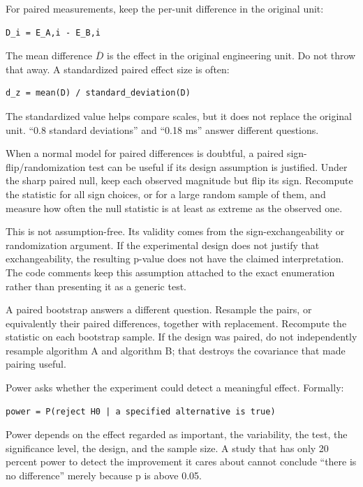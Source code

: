 For paired measurements, keep the per-unit difference in the original unit:

\begin{verbatim}
D_i = E_A,i - E_B,i
\end{verbatim}

The mean difference \(\overline{D}\) is the effect in the original engineering unit. Do not throw that away. A standardized paired effect size is often:

\begin{verbatim}
d_z = mean(D) / standard_deviation(D)
\end{verbatim}

The standardized value helps compare scales, but it does not replace the original unit. ``0.8 standard deviations'' and ``0.18 ms'' answer different questions.

When a normal model for paired differences is doubtful, a paired sign-flip/randomization test can be useful if its design assumption is justified. Under the sharp paired null, keep each observed magnitude but flip its sign. Recompute the statistic for all sign choices, or for a large random sample of them, and measure how often the null statistic is at least as extreme as the observed one.

This is not assumption-free. Its validity comes from the sign-exchangeability or randomization argument. If the experimental design does not justify that exchangeability, the resulting p-value does not have the claimed interpretation. The code comments keep this assumption attached to the exact enumeration rather than presenting it as a generic test.

A paired bootstrap answers a different question. Resample the pairs, or equivalently their paired differences, together with replacement. Recompute the statistic on each bootstrap sample. If the design was paired, do not independently resample algorithm A and algorithm B; that destroys the covariance that made pairing useful.

Power asks whether the experiment could detect a meaningful effect. Formally:

\begin{verbatim}
power = P(reject H0 | a specified alternative is true)
\end{verbatim}

Power depends on the effect regarded as important, the variability, the test, the significance level, the design, and the sample size. A study that has only 20 percent power to detect the improvement it cares about cannot conclude ``there is no difference'' merely because p is above 0.05.

